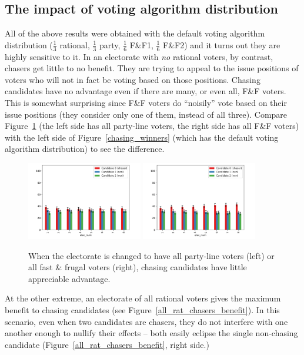 \subsection{The impact of voting algorithm distribution}

All of the above results were obtained with the default voting algorithm
distribution ($\frac{1}{3}$ rational, $\frac{1}{3}$ party, $\frac{1}{6}$ F\&F1,
$\frac{1}{6}$ F\&F2) and it turns out they are highly sensitive to it. In an
electorate with \textit{no} rational voters, by contrast, chasers get little to
no benefit. They are trying to appeal to the issue positions of voters who will
not in fact be voting based on those positions. Chasing candidates have no
advantage even if there are many, or even all, F\&F voters. This is somewhat
surprising since F\&F voters do ``noisily'' vote based on their issue positions
(they consider only one of them, instead of all three). Compare
Figure~\ref{chasing_vs_distro} (the left side has all party-line voters, the
right side has all F\&F voters) with the left side of
Figure~\ref{chasing_winners} (which has the default voting algorithm
distribution) to see the difference.

\begin{figure}[ht]
\centering
\includegraphics[width=0.45\textwidth]{assets/all_party_1_chaser_no_benefit.png}
\includegraphics[width=0.45\textwidth]{assets/all_ff_chasers_no_benefit.png}
\caption{When the electorate is changed to have all party-line voters (left) or
all fast \& frugal voters (right), chasing candidates have little appreciable
advantage.}
\label{chasing_vs_distro}
\end{figure}

At the other extreme, an electorate of all rational voters gives the maximum
benefit to chasing candidates (see Figure~\ref{all_rat_chasers_benefit}). In
this scenario, even when two candidates are chasers, they do not interfere with
one another enough to nullify their effects -- both easily eclipse the single
non-chasing candidate (Figure~\ref{all_rat_chasers_benefit}, right side.)

